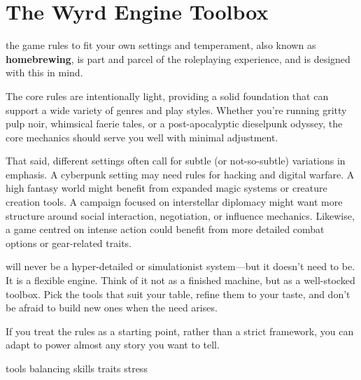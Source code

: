 \chapter{The Wyrd Engine Toolbox}

 the game rules to fit your own settings and temperament, also known as \textbf{homebrewing}, is part and parcel of the roleplaying experience, and \wyrd is designed with this in mind.  

The core rules are intentionally light, providing a solid foundation that can support a wide variety of genres and play styles. Whether you're running gritty pulp noir, whimsical faerie tales, or a post-apocalyptic dieselpunk odyssey, the core mechanics should serve you well with minimal adjustment.

That said, different settings often call for subtle (or not-so-subtle) variations in emphasis. A cyberpunk setting may need rules for hacking and digital warfare. A high fantasy world might benefit from expanded magic systems or creature creation tools. A campaign focused on interstellar diplomacy might want more structure around social interaction, negotiation, or influence mechanics. Likewise, a game centred on intense action could benefit from more detailed combat options or gear-related traits.

\wyrd will never be a hyper-detailed or simulationist system—but it doesn't need to be. It is a flexible engine. Think of it not as a finished machine, but as a well-stocked toolbox. Pick the tools that suit your table, refine them to your taste, and don't be afraid to build new ones when the need arises. 

If you treat the rules as a starting point, rather than a strict framework, you can adapt \wyrd to power almost any story you want to tell.

{tools}
{balancing}
{skills}
{traits}
{stress}




